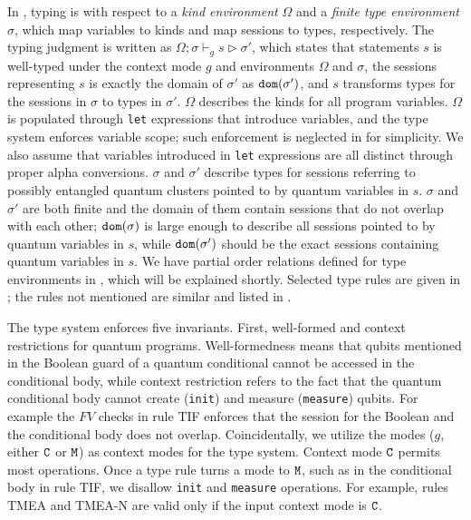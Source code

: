 In \qafny, typing is with respect to a \emph{kind environment} $\Omega$ and a \emph{finite type environment} $\sigma$,
which map \qafny variables to kinds and map sessions to types, respectively.
The typing judgment is written as $\Omega; \sigma\vdash_{g} s \triangleright \sigma'$,
which states that statements $s$ is well-typed under the context mode $g$ and environments $\Omega$ and $\sigma$,
the sessions representing $s$ is exactly the domain of $\sigma'$ as $\mathtt{dom}(\sigma')$,
and $s$ transforms types for the sessions in $\sigma$ to types in $\sigma'$.
$\Omega$ describes the kinds for all program variables.
$\Omega$ is populated through \texttt{let} expressions that introduce variables,
and the \qafny type system enforces variable scope; such enforcement is neglected in  for simplicity.
We also assume that variables introduced in \texttt{let} expressions are all distinct through proper alpha conversions.
$\sigma$ and $\sigma'$ describe types for sessions referring to possibly entangled quantum clusters pointed to by quantum variables in $s$. 
$\sigma$ and $\sigma'$ are both finite and the domain of them contain sessions that do not overlap with each other; $\mathtt{dom}(\sigma)$ is large enough to describe all sessions pointed to by quantum variables in $s$,
while $\mathtt{dom}(\sigma')$ should be the exact sessions containing quantum variables in $s$.
We have partial order relations defined for type environments in , which will be explained shortly.
Selected type rules are given in ; 
the rules not mentioned are similar and listed in .

The type system enforces five invariants.  First, well-formed and context restrictions for quantum programs.
Well-formedness means that qubits mentioned in the Boolean guard of a quantum conditional cannot be accessed in the conditional body,
while context restriction refers to the fact that the quantum conditional body cannot create (\texttt{init}) and measure (\texttt{measure}) qubits. 
For example the $FV$ checks in rule \textsc{TIF} enforces that the session for the Boolean and the conditional body does not overlap.
Coincidentally, we utilize the modes ($g$, either $\texttt{C}$ or $\texttt{M}$) as context modes for the type system. 
Context mode $\texttt{C}$ permits most \qafny operations. Once a type rule turns a mode to $\texttt{M}$, such as in the conditional body in rule \textsc{TIF}, we disallow \texttt{init} and \texttt{measure} operations. For example, rules \textsc{TMEA} and \textsc{TMEA-N} are valid only if the input context mode is $\texttt{C}$.

